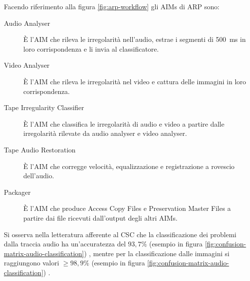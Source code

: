 Facendo riferimento alla figura \ref{fig:arp-workflow} gli \acp{AIM} di \ac{ARP} sono:
\begin{description}
    \item[Audio Analyser] È l'\ac{AIM} che rileva le irregolarità nell'audio, estrae i segmenti di \qty{500}{\ms} in loro corrispondenza e li invia al classificatore.
    \item[Video Analyser] È l'\ac{AIM} che rileva le irregolarità nel video e cattura delle immagini in loro corrispondenza.
    \item[Tape Irregularity Classifier] È l'\ac{AIM} che classifica le irregolarità di audio e video a partire dalle irregolarità rilevate da audio analyser e video analyser.   %
    \item[Tape Audio Restoration] È l'\ac{AIM} che corregge velocità, equalizzazione e registrazione a rovescio dell'audio.
    \item[Packager] È l'\ac{AIM} che produce Access Copy Files e Preservation Master Files a partire dai file ricevuti dall'output degli altri \acp{AIM}.
\end{description}

Si osserva nella letteratura afferente al \ac{CSC} che la classificazione dei problemi dalla traccia audio ha un'accuratezza del $93,7\%$ (esempio in figura \ref{fig:confusion-matrix-audio-classification}) \cite[min. 35:10]{mpaistandardsMPAIPresentsContextbased2023}, mentre per la classificazione dalle immagini si raggiungono valori $\geq 98,9\%$ (esempio in figura \ref{fig:confusion-matrix-audio-classification}) \cite[fig. 3 e p. 70]{prettoComputingMethodologiesSupporting2018}.

